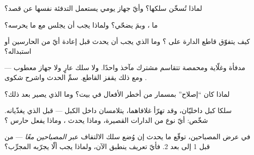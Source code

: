 \begin{exercise}[$\star$]\label{exo:g7:short-circuits-safety:4}
لماذا تُسخّن  سلكها؟ وأيّ جهاز يومي يستعمل
التدفئة نفسها عن قصد؟
\end{exercise}

\begin{exercise}[$\star$]\label{exo:g7:short-circuits-safety:5}
ما ، وبمَ يضحّي؟ ولماذا يجب أن يجلس  مع ما
يحرسه؟
\end{exercise}

\begin{exercise}[$\star$]\label{exo:g7:short-circuits-safety:6}
كيف يتفوّق قاطع الدارة على ؟ وما الذي يجب أن يحدث قبل
إعادة أيّ من الحارسين أو استبداله؟
\end{exercise}

\begin{exercise}[$\star$]\label{exo:g7:short-circuits-safety:7}
مدفأة وغلّاية ومحمصة تتقاسم مشترك مآخذ واحدًا. ولا سلك عارٍ ولا
جهاز معطوب --- ومع ذلك يقفز القاطع. سمِّ الحدث واشرح شكوى
.
\end{exercise}

\begin{exercise}[$\star$]\label{exo:g7:short-circuits-safety:8}
لماذا كان ``إصلاح''  بمسمار من أخطر الأفعال في بيت؟ وما
الذي يصير  بعد ذلك؟
\end{exercise}

\begin{exercise}[$\star\star$]\label{exo:g7:short-circuits-safety:9}
سلكا كبل داخليّان، وقد تهرّأ غلافاهما، يتلامسان داخل الكبل ---
قبل  الذي يغذّيانه. شخّص: أيّ نوع من الدارات القصيرة،
وماذا يحدث ، وماذا يفعل حارس ؟
\end{exercise}

\begin{exercise}[$\star\star$]\label{exo:g7:short-circuits-safety:10}
في عرض المصباحين، توقّع ما يحدث إن وُضع سلك الالتفاف عبر
\emph{المصباحين معًا} --- من قبل  1 إلى بعد  2.
فأيّ تعريف ينطبق الآن، ولماذا يجب ألّا يجرّبه المجرِّب؟
\end{exercise}

